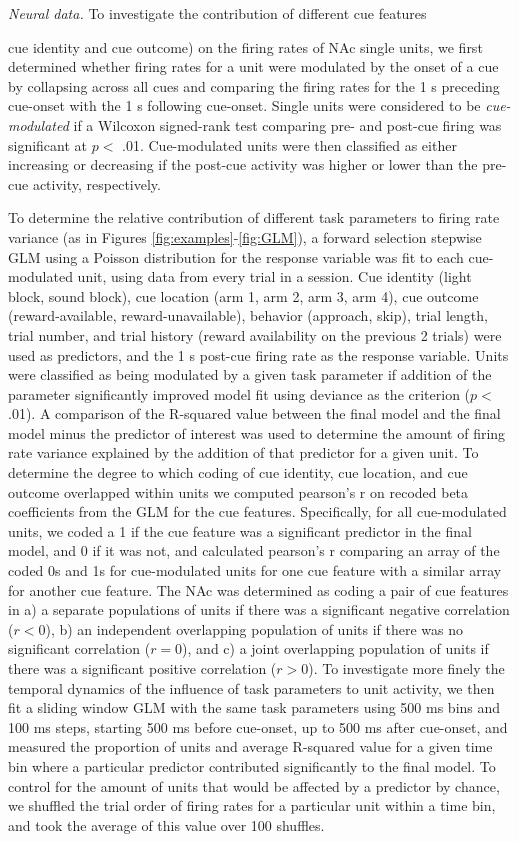 \documentclass[11pt]{article}
\begin{document}
{\it Neural data.} To investigate the contribution of different cue
features {cue identity and cue outcome) on the firing rates of NAc
single units, we first determined whether firing rates for a unit
were modulated by the onset of a cue by collapsing across all cues
and comparing the firing rates for the 1 s preceding cue-onset with
the 1 s following cue-onset. Single units were considered to be {\it
cue-modulated} if a Wilcoxon signed-rank test comparing pre- and
post-cue firing was significant at $p <$ .01. Cue-modulated units
were then classified as either increasing or decreasing if the
post-cue activity was higher or lower than the pre-cue activity,
respectively.

To determine the relative contribution of different task parameters to firing rate variance (as in Figures \ref{fig:examples}-\ref{fig:GLM}), a forward selection stepwise GLM using a Poisson distribution for the response variable was fit to each cue-modulated unit, using data from every trial in a session. Cue identity (light block, sound block), cue location (arm 1, arm 2, arm 3, arm 4), cue outcome (reward-available, reward-unavailable), behavior (approach, skip), trial length, trial number, and trial history (reward availability on the previous 2 trials) were used as predictors, and the 1 s post-cue firing rate as the response variable. Units were classified as being modulated by a
given task parameter if addition of the parameter significantly improved model fit using deviance as the criterion ($p <$ .01). A comparison of the R-squared value between the final model and the final model minus the predictor of interest was used to determine the amount of firing rate variance explained by the addition of that predictor for a given unit. To determine the degree to which coding of cue identity, cue location, and cue outcome overlapped within units we computed pearson’s r on recoded beta coefficients from the GLM for the cue features. Specifically, for all cue-modulated units, we coded a 1 if the cue feature was a significant predictor in the final model, and 0 if it was not, and calculated pearson’s r comparing an array of the coded 0s and 1s for cue-modulated units for one cue feature with a similar array for another cue feature. The NAc was determined as coding a pair of cue features in a) a separate populations of units if there was a significant negative correlation ($r < $0), b) an independent overlapping population of units if there was no significant correlation ($r = $0), and c) a joint overlapping population of units if there was a significant positive correlation ($r > $0). To investigate more finely the temporal dynamics of the influence of task parameters to unit activity, we then fit a sliding window GLM with the same task parameters using 500 ms bins and 100 ms steps, starting 500 ms before cue-onset, up to 500 ms after cue-onset, and measured the proportion of units and average R-squared value for a given time bin where a particular predictor contributed significantly to the final model. To control for the amount of units that would be affected by a predictor by chance, we shuffled the trial order of firing rates for a particular unit within a time bin, and took the average of this value over 100 shuffles.

}
\end{document}
